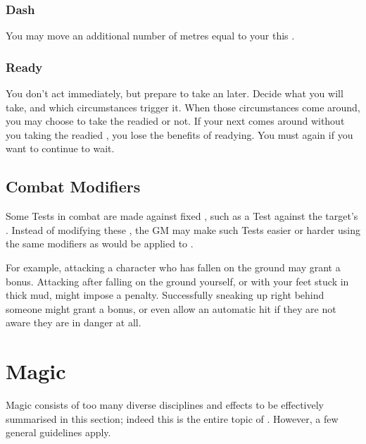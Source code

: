 \subsubsection{Dash}

You may move an additional number of metres equal to your  this {\turn}.

\subsubsection{Ready}

You don't act immediately, but prepare to take an {\action} later.
Decide what {\action} you will take, and which circumstances trigger it.
When those circumstances come around, you may choose to take the readied {\action} or not.
If your next {\turn} comes around without you taking the readied {\action}, you lose the benefits of readying.
You must  again if you want to continue to wait.

\subsection{Combat Modifiers}

Some Tests in combat are made against fixed {\tns}, such as a  Test against the target's .
Instead of modifying these {\tns}, the GM may make such Tests easier or harder using the same modifiers as would be applied to {\opposedtests}.

For example, attacking a character who has fallen on the ground may grant a  bonus.
Attacking after falling on the ground yourself, or with your feet stuck in thick mud, might impose a  penalty.
Successfully sneaking up right behind someone might grant a  bonus, or even allow an automatic hit if they are not aware they are in danger at all.

\section{Magic}

Magic consists of too many diverse disciplines and effects to be effectively summarised in this section; indeed this is the entire topic of .
However, a few general guidelines apply.

